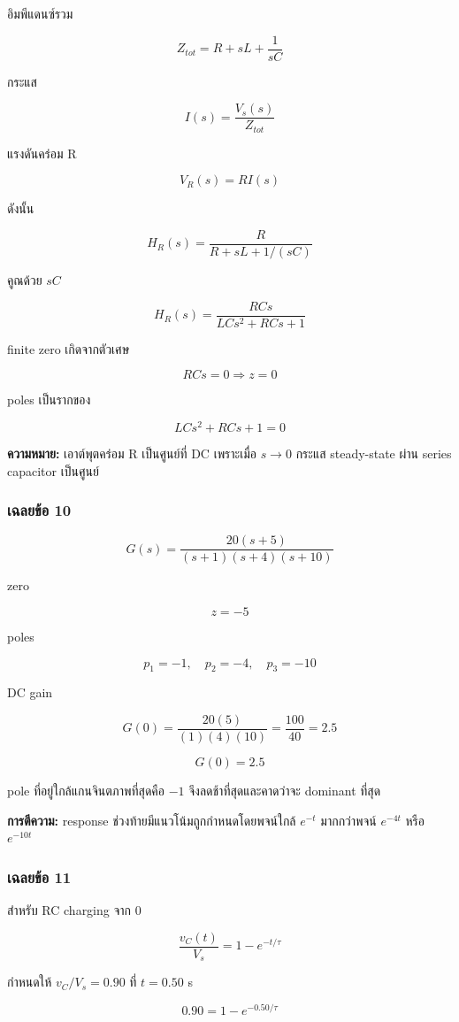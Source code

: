 อิมพีแดนซ์รวม

\[
Z_{tot}=R+sL+\frac{1}{sC}
\]

กระแส

\[
I(s)=\frac{V_s(s)}{Z_{tot}}
\]

แรงดันคร่อม R

\[
V_R(s)=RI(s)
\]

ดังนั้น

\[
H_R(s)=\frac{R}{R+sL+1/(sC)}
\]

คูณด้วย $sC$

\[
\boxed{H_R(s)=\frac{RCs}{LCs^2+RCs+1}}
\]

finite zero เกิดจากตัวเศษ

\[
RCs=0\Rightarrow \boxed{z=0}
\]

poles เป็นรากของ

\[
\boxed{LCs^2+RCs+1=0}
\]

\textbf{ความหมาย:} เอาต์พุตคร่อม R เป็นศูนย์ที่ DC เพราะเมื่อ $s\to0$ กระแส steady-state ผ่าน series capacitor เป็นศูนย์

\subsubsection{เฉลยข้อ 10}

\[
G(s)=\frac{20(s+5)}{(s+1)(s+4)(s+10)}
\]

zero

\[
\boxed{z=-5}
\]

poles

\[
\boxed{p_1=-1,\quad p_2=-4,\quad p_3=-10}
\]

DC gain

\[
G(0)=\frac{20(5)}{(1)(4)(10)}=\frac{100}{40}=2.5
\]

\[
\boxed{G(0)=2.5}
\]

pole ที่อยู่ใกล้แกนจินตภาพที่สุดคือ $-1$ จึงลดช้าที่สุดและคาดว่าจะ dominant ที่สุด

\textbf{การตีความ:} response ช่วงท้ายมีแนวโน้มถูกกำหนดโดยพจน์ใกล้ $e^{-t}$ มากกว่าพจน์ $e^{-4t}$ หรือ $e^{-10t}$

\subsubsection{เฉลยข้อ 11}

สำหรับ RC charging จาก 0

\[
\frac{v_C(t)}{V_s}=1-e^{-t/\tau}
\]

กำหนดให้ $v_C/V_s=0.90$ ที่ $t=0.50$ s

\[
0.90=1-e^{-0.50/\tau}
\]


